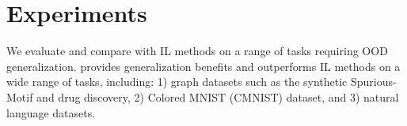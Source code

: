 
\section{Experiments}




We evaluate \ours and compare with IL methods on a range of tasks requiring OOD generalization. 
\ours provides generalization benefits and outperforms IL methods on a wide range of tasks, including: 1) graph datasets such as the synthetic Spurious-Motif and drug discovery, 2) Colored MNIST (CMNIST) dataset, and 3) natural language datasets.  



